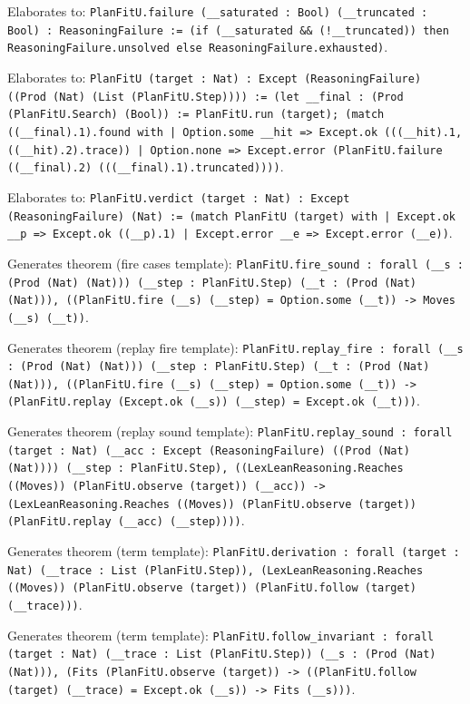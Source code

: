 \documentclass[11pt]{article}
\begin{document}
\noindent Elaborates to: \texttt{PlanFitU.failure (\_\_saturated : Bool) (\_\_truncated : Bool) : ReasoningFailure := (if (\_\_saturated \&\& (!\_\_truncated)) then ReasoningFailure.unsolved else ReasoningFailure.exhausted)}.\par
\noindent Elaborates to: \texttt{PlanFitU (target : Nat) : Except (ReasoningFailure) ((Prod (Nat) (List (PlanFitU.Step)))) := (let \_\_final : (Prod (PlanFitU.Search) (Bool)) := PlanFitU.run (target); (match ((\_\_final).1).found with | Option.some \_\_hit => Except.ok (((\_\_hit).1, ((\_\_hit).2).trace)) | Option.none => Except.error (PlanFitU.failure ((\_\_final).2) (((\_\_final).1).truncated))))}.\par
\noindent Elaborates to: \texttt{PlanFitU.verdict (target : Nat) : Except (ReasoningFailure) (Nat) := (match PlanFitU (target) with | Except.ok \_\_p => Except.ok ((\_\_p).1) | Except.error \_\_e => Except.error (\_\_e))}.\par
\noindent Generates theorem (fire cases template): \texttt{PlanFitU.fire\_sound : forall (\_\_s : (Prod (Nat) (Nat))) (\_\_step : PlanFitU.Step) (\_\_t : (Prod (Nat) (Nat))), ((PlanFitU.fire (\_\_s) (\_\_step) = Option.some (\_\_t)) -> Moves (\_\_s) (\_\_t))}.\par
\noindent Generates theorem (replay fire template): \texttt{PlanFitU.replay\_fire : forall (\_\_s : (Prod (Nat) (Nat))) (\_\_step : PlanFitU.Step) (\_\_t : (Prod (Nat) (Nat))), ((PlanFitU.fire (\_\_s) (\_\_step) = Option.some (\_\_t)) -> (PlanFitU.replay (Except.ok (\_\_s)) (\_\_step) = Except.ok (\_\_t)))}.\par
\noindent Generates theorem (replay sound template): \texttt{PlanFitU.replay\_sound : forall (target : Nat) (\_\_acc : Except (ReasoningFailure) ((Prod (Nat) (Nat)))) (\_\_step : PlanFitU.Step), ((LexLeanReasoning.Reaches ((Moves)) (PlanFitU.observe (target)) (\_\_acc)) -> (LexLeanReasoning.Reaches ((Moves)) (PlanFitU.observe (target)) (PlanFitU.replay (\_\_acc) (\_\_step))))}.\par
\noindent Generates theorem (term template): \texttt{PlanFitU.derivation : forall (target : Nat) (\_\_trace : List (PlanFitU.Step)), (LexLeanReasoning.Reaches ((Moves)) (PlanFitU.observe (target)) (PlanFitU.follow (target) (\_\_trace)))}.\par
\noindent Generates theorem (term template): \texttt{PlanFitU.follow\_invariant : forall (target : Nat) (\_\_trace : List (PlanFitU.Step)) (\_\_s : (Prod (Nat) (Nat))), (Fits (PlanFitU.observe (target)) -> ((PlanFitU.follow (target) (\_\_trace) = Except.ok (\_\_s)) -> Fits (\_\_s)))}.\par
\end{document}
